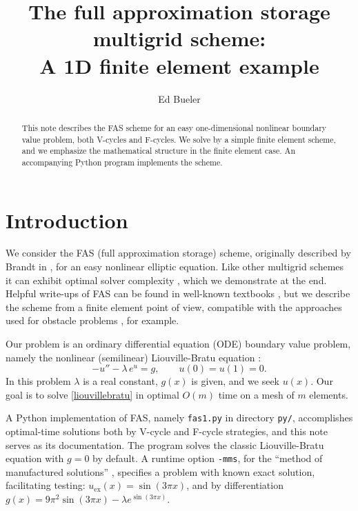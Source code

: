 \documentclass[letterpaper,final,12pt,reqno]{amsart}
\begin{document}
\title[The FAS multigrid scheme]{The full approximation storage multigrid scheme: \\ A 1D finite element example}

\author{Ed Bueler}

\begin{abstract}  This note describes the FAS scheme for an easy one-dimensional nonlinear boundary value problem, both V-cycles and F-cycles.  We solve by a simple finite element scheme, and we emphasize the  mathematical structure in the finite element case.  An accompanying Python program implements the scheme.
\end{abstract}

\maketitle

\thispagestyle{empty}
\bigskip

\section{Introduction}

We consider the FAS (full approximation storage) scheme, originally described by Brandt in \cite{Brandt1977}, for an easy nonlinear elliptic equation.  Like other multigrid schemes it can exhibit optimal solver complexity \cite{Bueler2021}, which we demonstrate at the end.  Helpful write-ups of FAS can be found in well-known textbooks \cite{BrandtLivne2011,Briggsetal2000,Trottenbergetal2001}, but we describe the scheme from a finite element point of view, compatible with the approaches used for obstacle problems \cite{GraeserKornhuber2009}, for example.

Our problem is an ordinary differential equation (ODE) boundary value problem, namely the nonlinear (semilinear) Liouville-Bratu equation \cite{Bratu1914,Liouville1853}:
\begin{equation}
  -u'' - \lambda\, e^u = g,  \qquad u(0) = u(1) = 0.  \label{liouvillebratu}
\end{equation}
In this problem $\lambda$ is a real constant, $g(x)$ is given, and we seek $u(x)$.  Our goal is to solve \eqref{liouvillebratu} in optimal $O(m)$ time on a mesh of $m$ elements.

A Python implementation of FAS, namely \texttt{fas1.py} in directory \texttt{py/}, accomplishes optimal-time solutions both by V-cycle and F-cycle strategies, and this note serves as its documentation.  The program solves the classic Liouville-Bratu equation with $g=0$ by default.  A runtime option \texttt{-mms}, for the ``method of manufactured solutions'' \cite{Bueler2021}, specifies a problem with known exact solution, facilitating testing: $u_{\text{ex}}(x)=\sin(3\pi x)$, and by differentiation $g(x)=9\pi^2 \sin(3\pi x) - \lambda e^{\sin(3\pi x)}$.
\end{document}
